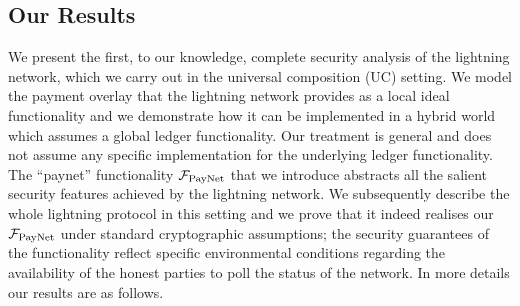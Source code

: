 \subsection{Our Results}
We present the first, to our knowledge, complete
security analysis of the lightning network, which we carry out in the
universal composition (UC) setting. We model the payment overlay that the
lightning network provides as a local ideal functionality and we demonstrate how it
can be implemented in a hybrid world which assumes a global ledger
functionality. Our treatment is general and does not assume any specific
implementation for the underlying ledger functionality. The ``paynet''
functionality $\mathcal{F}_{\mathrm{PayNet}}{}$ that we introduce abstracts all the salient security features
achieved by the lightning network. We subsequently describe the whole lightning
protocol in this setting and we prove that it indeed realises our $\mathcal{F}_{\mathrm{PayNet}}{}$
under standard cryptographic assumptions; the security guarantees of the
functionality reflect specific environmental conditions regarding the
availability of the honest parties to poll the status of the network. In more
details our results are as follows.

